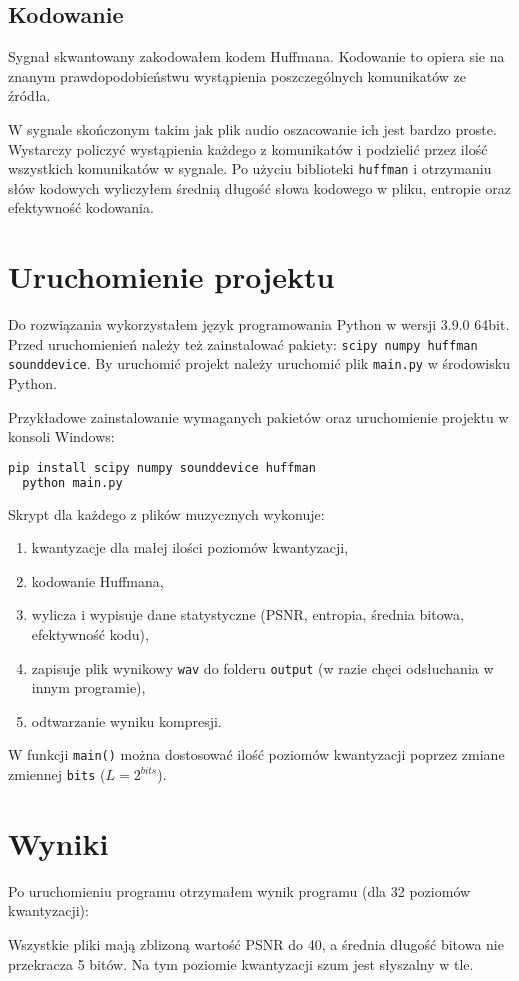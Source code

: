 \documentclass[12pt]{article}
\def\code#1{\texttt{#1}}
\begin{document}
\subsection{Kodowanie}
Sygnał skwantowany zakodowałem kodem Huffmana. Kodowanie to opiera sie na znanym prawdopodobieństwu wystąpienia poszczególnych komunikatów ze źródła.

W sygnale skończonym takim jak plik audio oszacowanie ich jest bardzo proste. Wystarczy policzyć wystąpienia każdego z komunikatów i podzielić przez ilość wszystkich komunikatów w sygnale.
Po użyciu biblioteki \code{huffman} i otrzymaniu słów kodowych wyliczyłem średnią długość słowa kodowego w pliku, entropie oraz efektywność kodowania.

\section{Uruchomienie projektu}

Do rozwiązania wykorzystałem język programowania Python w wersji 3.9.0 64bit.
Przed uruchomienień należy też zainstalować pakiety: \code{scipy numpy huffman sounddevice}.
By uruchomić projekt należy uruchomić plik \code{main.py} w środowisku Python.

Przykładowe zainstalowanie wymaganych pakietów oraz uruchomienie projektu w konsoli Windows:
\begin{lstlisting}[language=bash]
  pip install scipy numpy sounddevice huffman
  python main.py
\end{lstlisting}
Skrypt dla każdego z plików muzycznych wykonuje:
\begin{enumerate}
  \item kwantyzacje dla małej ilości poziomów kwantyzacji,
  \item kodowanie Huffmana,
  \item wylicza i wypisuje dane statystyczne (PSNR, entropia, średnia bitowa, efektywność kodu),
  \item zapisuje plik wynikowy \code{wav} do folderu \code{output} (w razie chęci odsłuchania w innym programie),
  \item odtwarzanie wyniku kompresji.
\end{enumerate}
W funkcji \code{main()} można dostosować ilość poziomów kwantyzacji poprzez zmiane zmiennej \code{bits} ($L=2^{bits}$).

\section{Wyniki}\label{results}
Po uruchomieniu programu otrzymałem wynik programu (dla 32 poziomów kwantyzacji):

Wszystkie pliki mają zblizoną wartość PSNR do 40, a średnia długość bitowa nie przekracza 5 bitów.
Na tym poziomie kwantyzacji szum jest słyszalny w tle.
\end{document}
